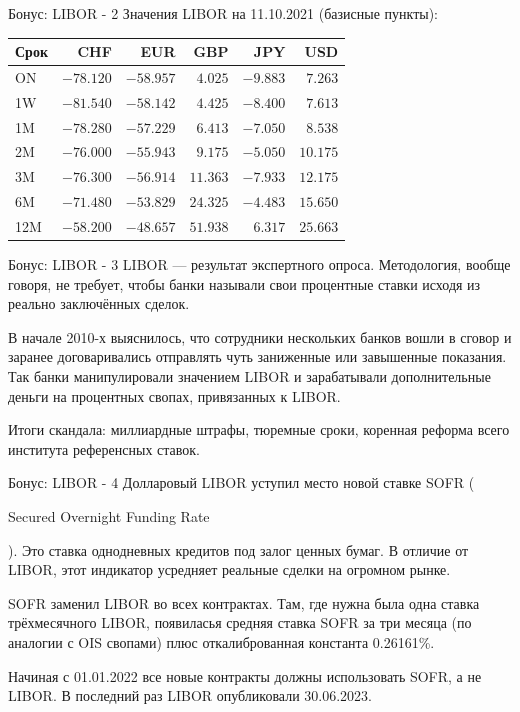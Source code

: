 \documentclass{beamer}
\newcommand{\en}[1]{\begin{otherlanguage}{english}#1\end{otherlanguage}}
\begin{document}
\begin{frame}{Бонус: LIBOR - 2}
\justify
Значения LIBOR на 11.10.2021 (базисные пункты):
\justify
\centering
\begin{tabular}{l|r|r|r|r|r}
Срок & CHF       & EUR       & GBP      & JPY      & USD \\ \hline
ON   & $-78.120$ & $-58.957$ & $4.025$  & $-9.883$ & $7.263$ \\
1W   & $-81.540$ & $-58.142$ & $4.425$  & $-8.400$ & $7.613$ \\
1M   & $-78.280$ & $-57.229$ & $6.413$  & $-7.050$ & $8.538$ \\
2M   & $-76.000$ & $-55.943$ & $9.175$  & $-5.050$ & $10.175$ \\
3M   & $-76.300$ & $-56.914$ & $11.363$ & $-7.933$ & $12.175$ \\
6M   & $-71.480$ & $-53.829$ & $24.325$ & $-4.483$ & $15.650$ \\
12M  & $-58.200$ & $-48.657$ & $51.938$ & $6.317$  & $25.663$
\end{tabular}
\end{frame}



\begin{frame}{Бонус: LIBOR - 3}
\justify
LIBOR --- результат экспертного опроса. Методология, вообще говоря, не требует, чтобы банки называли свои процентные ставки исходя из реально заключённых сделок.

\justify
В начале 2010-х выяснилось, что сотрудники нескольких банков вошли в сговор и заранее договаривались отправлять чуть заниженные или завышенные показания. Так банки манипулировали значением LIBOR и зарабатывали дополнительные деньги на процентных свопах, привязанных к LIBOR.

\justify
Итоги скандала: миллиардные штрафы, тюремные сроки, коренная реформа всего института референсных ставок.
\end{frame}



\begin{frame}{Бонус: LIBOR - 4}
\justify
Долларовый LIBOR уступил место новой ставке \alert{SOFR} (\en{Secured Overnight Funding Rate}). Это ставка однодневных кредитов под залог ценных бумаг. В отличие от LIBOR, этот индикатор усредняет реальные сделки на огромном рынке.

\justify
SOFR заменил LIBOR во всех контрактах. Там, где нужна была одна ставка трёхмесячного LIBOR, появиласья средняя ставка SOFR за три месяца (по аналогии с OIS свопами) плюс откалиброванная константа 0.26161\%.

\justify
Начиная с 01.01.2022 все новые контракты должны использовать SOFR, а не LIBOR. В последний раз LIBOR опубликовали 30.06.2023.
\end{frame}
\end{document}
